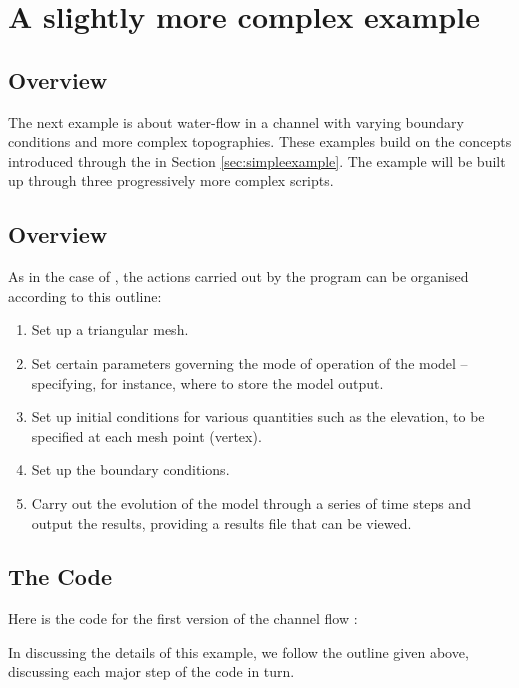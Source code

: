 \documentclass{manual}
\begin{document}
\clearpage


\section{A slightly more complex example}
\label{sec:channelexample}

\subsection{Overview}

The next example is about water-flow in a channel with varying boundary conditions and
more complex topographies. These examples build on the
concepts introduced through the  in Section \ref{sec:simpleexample}.
The example will be built up through three progressively more complex scripts.

\subsection{Overview}

As in the case of , the actions carried
out by the program can be organised according to this outline:
\begin{enumerate}
   \item Set up a triangular mesh.
   \item Set certain parameters governing the mode of
         operation of the model -- specifying, for instance, where to store the
         model output.
   \item Set up initial conditions for various quantities such as the elevation, to be specified at each mesh point (vertex).
   \item Set up the boundary conditions.
   \item Carry out the evolution of the model through a series of time
         steps and output the results, providing a results file that can be
         viewed.
\end{enumerate}

\subsection{The Code}

Here is the code for the first version of the channel flow :



In discussing the details of this example, we follow the outline
given above, discussing each major step of the code in turn.
\end{document}
